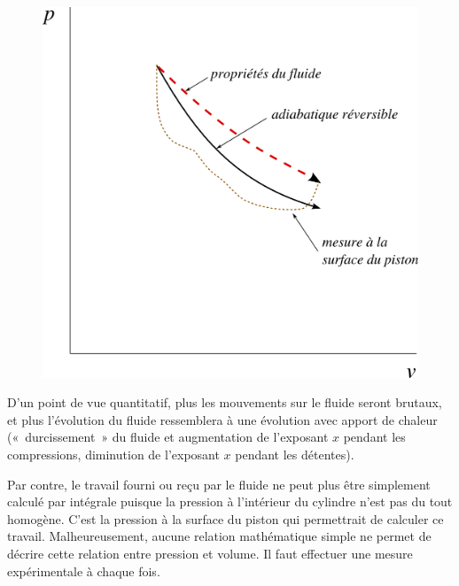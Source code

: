 		\begin{figure}
			\begin{center}
			\includegraphics[width=\textwidth]{images/pv_detente_irreversible.png}
			\end{center}
			\label{fig_p-v_détente_irr}
		\end{figure}

		D’un point de vue quantitatif, plus les mouvements sur le fluide seront brutaux, et plus l’évolution du fluide ressemblera à une évolution avec apport de chaleur («~durcissement~» du fluide et augmentation de l’exposant $x$ pendant les compressions, diminution de l’exposant $x$ pendant les détentes). 

		Par contre, le travail fourni ou reçu par le fluide ne peut plus être simplement calculé par intégrale puisque la pression à l’intérieur du cylindre n’est pas du tout homogène. C’est la pression à la surface du piston qui permettrait de calculer ce travail. Malheureusement, aucune relation mathématique simple ne permet de décrire cette relation entre pression et volume. Il faut effectuer une mesure expérimentale à chaque fois.
		
